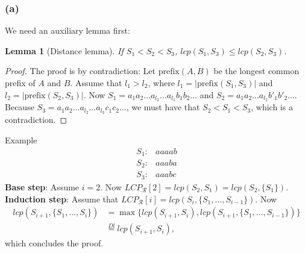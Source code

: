 \documentclass[10pt]{article}
\newtheorem{lemma}{Lemma}
\begin{document}
\subsubsection*{(a)}
We need an auxiliary lemma first: 
\begin{lemma}[Distance lemma]
If $S_1 < S_2 < S_3$, $lcp(S_1, S_3) \leq lcp(S_2, S_3)$.
\end{lemma}
\begin{proof}
The proof is by contradiction: Let $\text{prefix}(A, B)$ be the longest common prefix of $A$ and $B$. Assume that $l_1 > l_2$, where $l_1 = |\text{prefix}(S_1, S_3)|$ and $l_2 = |\text{prefix}(S_2, S_3)|$. Now $S_1 = a_1 a_2 \dots a_{l_2} \dots a_{l_1} b_1 b_2 \dots$ and $S_2 = a_1 a_2 \dots a_{l_2} b'_1 b'_2 \dots$. Because $S_3 = a_1 a_2 \dots a_{l_2} \dots a_{l_3} c_1 c_2 \dots$, we must have that $S_2 < S_1 < S_3$, which is a contradiction.
\end{proof}
Example
\begin{align*}
S_1: & aaaab \\
S_2: & aaaba \\
S_3: & aaabc
\end{align*}
\noindent \textbf{Base step}: Assume $i = 2$. Now $LCP_{\mathcal{R}}[2] = lcp(S_2, S_1) = lcp(S_2, \{ S_1 \})$. \\
\textbf{Induction step}: Assume that $LCP_{\mathcal{R}}[i] = lcp(S_i, \{ S_1, \dots, S_{i - 1} \})$. Now
\begin{align*}
lcp(S_{i + 1}, \{ S_1, \dots, S_i \}) &= \max \{ lcp(S_{i + 1}, S_i), lcp(S_{i + 1}, \{ S_1, \dots, S_{i - 1} \}) \} \\
											  		 &\overset{Dl}{=} lcp(S_{i + 1}, S_i),
\end{align*}
which concludes the proof.
\end{document}
